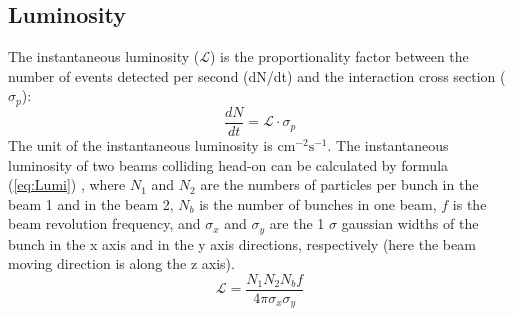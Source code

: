 \subsection{Luminosity}\label{sec:LHC_luminosity}
The instantaneous luminosity ($\mathcal{L}$) is the proportionality factor
between the number of events detected per second (dN/dt) and the interaction cross section ($\sigma_{p}$):
\begin{equation}
\frac{dN}{dt}=\mathcal{L}\cdot\sigma_{p}
\label{eq:define_Lumi}
\end{equation}
The unit of the instantaneous luminosity is $\mathrm{cm^{-2}s^{-1}}$.
The instantaneous luminosity of two beams colliding head-on can be calculated by formula (\ref{eq:Lumi}) \cite{Herr2013}, where $N_{1}$ and $N_{2}$ are the numbers of particles per bunch in the beam 1 and in the beam 2, $N_{b}$ is the number of bunches in one beam, $f$ is the beam revolution frequency, and $\sigma_{x}$ and $\sigma_{y}$ are the 1 $\sigma$ gaussian widths of the bunch in the x axis and in the y axis directions, respectively (here the beam moving direction is along the z axis).
\begin{equation}
\mathcal{L}=\frac{N_{1}N_{2}N_{b}f}{4\pi\sigma_{x}\sigma_{y}}
\label{eq:Lumi}
\end{equation}

